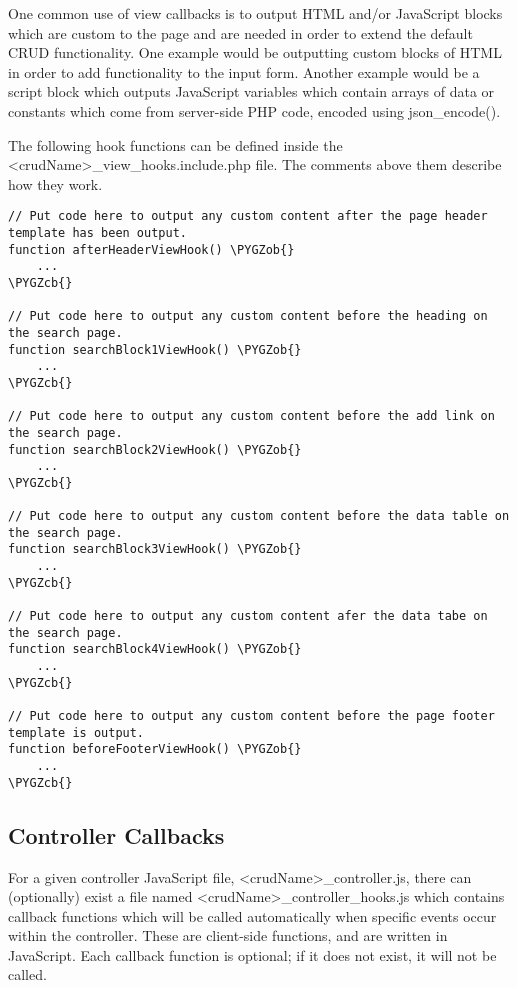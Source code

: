 \documentclass[letterpaper,10pt,english]{sphinxmanual}
\def\PYGZob{\char`\{}
\def\PYGZcb{\char`\}}
\begin{document}
One common use of view callbacks is to output HTML and/or JavaScript blocks which are custom to the
page and are needed in order to extend the default CRUD functionality.  One example would be
outputting custom blocks of HTML in order to add functionality to the input form.  Another example
would be a script block which outputs JavaScript variables which contain arrays of data or constants
which come from server-side PHP code, encoded using json\_encode().

The following hook functions can be defined inside the \textless{}crudName\textgreater{}\_view\_hooks.include.php file.
The comments above them describe how they work.

\begin{Verbatim}[commandchars=\\\{\}]
// Put code here to output any custom content after the page header template has been output.
function afterHeaderViewHook() \PYGZob{}
    ...
\PYGZcb{}

// Put code here to output any custom content before the heading on the search page.
function searchBlock1ViewHook() \PYGZob{}
    ...
\PYGZcb{}

// Put code here to output any custom content before the add link on the search page.
function searchBlock2ViewHook() \PYGZob{}
    ...
\PYGZcb{}

// Put code here to output any custom content before the data table on the search page.
function searchBlock3ViewHook() \PYGZob{}
    ...
\PYGZcb{}

// Put code here to output any custom content afer the data tabe on the search page.
function searchBlock4ViewHook() \PYGZob{}
    ...
\PYGZcb{}

// Put code here to output any custom content before the page footer template is output.
function beforeFooterViewHook() \PYGZob{}
    ...
\PYGZcb{}
\end{Verbatim}


\subsection{Controller Callbacks}
\label{jaxFrameworkGuide:controller-callbacks}
For a given controller JavaScript file, \textless{}crudName\textgreater{}\_controller.js, there can (optionally) exist a
file named \textless{}crudName\textgreater{}\_controller\_hooks.js which contains callback functions which will be called
automatically when specific events occur within the controller.  These are client-side functions,
and are written in JavaScript.  Each callback function is optional; if it does not exist, it will
not be called.
\end{document}

